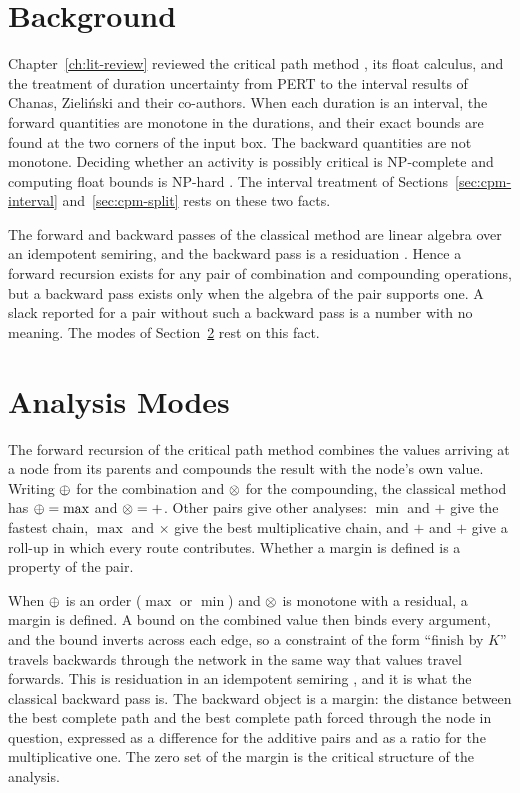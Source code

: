 \documentclass[12pt]{report}
\begin{document}
\section{Background}
\label{sec:cpm-grounding}

Chapter~\ref{ch:lit-review} reviewed the critical path method \cite{kelley1959critical},
its float calculus, and the treatment of duration uncertainty from PERT
\cite{malcolm1959pert} to the interval results of Chanas, Zieli\'{n}ski and their
co-authors. When each duration is an interval, the forward quantities are monotone in the durations,
and their exact bounds are found at the two corners of the input box. The backward
quantities are not monotone. Deciding whether an activity is possibly critical is
NP-complete and computing float bounds is NP-hard
\cite{chanas2002complexity,chanas2003planar,dubois2005floats,fortin2010criticality}. The
interval treatment of Sections~\ref{sec:cpm-interval} and~\ref{sec:cpm-split} rests on
these two facts.

The forward and backward passes of the classical method are linear algebra over an
idempotent semiring, and the backward pass is a residuation \cite{baccelli1992sync}.
Hence a forward recursion exists for any pair of combination and compounding operations,
but a backward pass exists only when the algebra of the pair supports one. A slack
reported for a pair without such a backward pass is a number with no meaning. The modes of
Section~\ref{sec:cpm-modes} rest on this fact.

\section{Analysis Modes}
\label{sec:cpm-modes}

The forward recursion of the critical path method combines the values arriving at a node
from its parents and compounds the result with the node's own value. Writing $\oplus$ for
the combination and $\otimes$ for the compounding, the classical method has $\oplus = \max$
and $\otimes = +$. Other pairs give other analyses: $\min$ and $+$ give the fastest chain,
$\max$ and $\times$ give the best multiplicative chain, and $+$ and $+$ give a roll-up in
which every route contributes. Whether a margin is defined is a property of the pair.

When $\oplus$ is an order ($\max$ or $\min$) and $\otimes$ is monotone with a residual, a
margin is defined. A bound on the combined value then binds every argument, and the bound inverts
across each edge, so a constraint of the form ``finish by $K$'' travels backwards through
the network in the same way that values travel forwards. This is residuation in an
idempotent semiring \cite{baccelli1992sync}, and it is what the classical backward pass
is. The backward object is a margin: the distance between the best complete path and the
best complete path forced through the node in question, expressed as a difference for the
additive pairs and as a ratio for the multiplicative one. The zero set of the margin is
the critical structure of the analysis.
\end{document}
